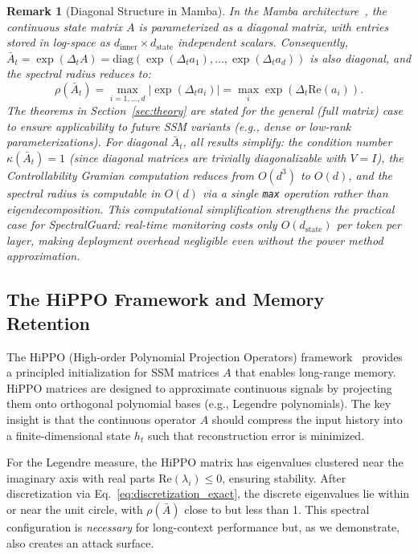 \documentclass[10pt,twocolumn]{article}
\newtheorem{remark}{Remark}
\begin{document}
\begin{remark}[Diagonal Structure in Mamba]
\label{rem:diagonal}
In the Mamba architecture~\cite{gu2023mamba}, the continuous state matrix $A$ is parameterized as a \emph{diagonal} matrix, with entries stored in log-space as $d_{\text{inner}} \times d_{\text{state}}$ independent scalars. Consequently, $\bar{A}_t = \exp(\Delta_t A) = \text{diag}(\exp(\Delta_t a_1), \dots, \exp(\Delta_t a_d))$ is also diagonal, and the spectral radius reduces to:
\begin{equation}
    \rho(\bar{A}_t) = \max_{i=1,\dots,d} |\exp(\Delta_t a_i)| = \max_i \exp(\Delta_t \text{Re}(a_i)).
    \label{eq:diagonal_rho}
\end{equation}
The theorems in Section~\ref{sec:theory} are stated for the general (full matrix) case to ensure applicability to future SSM variants (e.g., dense or low-rank parameterizations). For diagonal $\bar{A}_t$, all results simplify: the condition number $\kappa(\bar{A}_t) = 1$ (since diagonal matrices are trivially diagonalizable with $V = I$), the Controllability Gramian computation reduces from $O(d^3)$ to $O(d)$, and the spectral radius is computable in $O(d)$ via a single \texttt{max} operation rather than eigendecomposition. This computational simplification \emph{strengthens} the practical case for SpectralGuard: real-time monitoring costs only $O(d_{\text{state}})$ per token per layer, making deployment overhead negligible even without the power method approximation.
\end{remark}

\subsection{The HiPPO Framework and Memory Retention}

The HiPPO (High-order Polynomial Projection Operators) framework~\cite{gu2020hippo} provides a principled initialization for SSM matrices $A$ that enables long-range memory. HiPPO matrices are designed to approximate continuous signals by projecting them onto orthogonal polynomial bases (e.g., Legendre polynomials). The key insight is that the continuous operator $A$ should compress the input history into a finite-dimensional state $h_t$ such that reconstruction error is minimized.

For the Legendre measure, the HiPPO matrix has eigenvalues clustered near the imaginary axis with real parts $\text{Re}(\lambda_i) \le 0$, ensuring stability. After discretization via Eq.~\eqref{eq:discretization_exact}, the discrete eigenvalues lie within or near the unit circle, with $\rho(\bar{A})$ close to but less than 1. This spectral configuration is \emph{necessary} for long-context performance but, as we demonstrate, also creates an attack surface.
\end{document}
